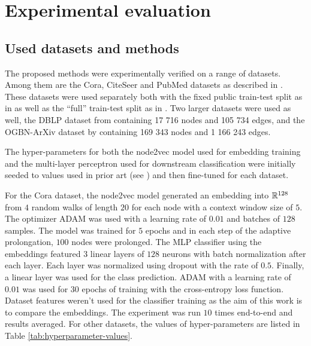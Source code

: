 \section{Experimental evaluation}

\subsection{Used datasets and methods}

The proposed methods were experimentally verified on a range of datasets. Among them are the Cora, CiteSeer and PubMed datasets as described in \cite{yang_revisiting_2016}. These datasets were used separately both with the fixed public train-test split as in \cite{yang_revisiting_2016} as well as the \enquote{full} train-test split as in \cite{chen_fastgcn_2018}. Two larger datasets were used as well, the DBLP dataset from \cite{bojchevski_deep_2018} containing 17 716 nodes and 105 734 edges, and the OGBN-ArXiv dataset by \cite{hu_open_2021} containing 169 343 nodes and 1 166 243 edges.

The hyper-parameters for both the node2vec model used for embedding training and the multi-layer perceptron used for downstream classification were initially seeded to values used in prior art (see \cite{hu_open_2021}) and then fine-tuned for each dataset.

For the Cora dataset, the node2vec model generated an embedding into \( \mathbb{R}^{128} \) from \( 4 \) random walks of length \( 20 \) for each node with a context window size of \( 5 \). The optimizer ADAM \cite{kingma_adam:_2017} was used with a learning rate of \( 0.01 \) and batches of \( 128 \) samples. The model was trained for \( 5 \) epochs and in each step of the adaptive prolongation, \( 100 \) nodes were prolonged. The MLP classifier using the embeddings featured \( 3 \) linear layers of \( 128 \) neurons with batch normalization after each layer. Each layer was normalized using dropout \cite{srivastava_dropout_2014} with the rate of \( 0.5 \). Finally, a linear layer was used for the class prediction. ADAM with a learning rate of \( 0.01 \)  was used for \( 30 \) epochs of training with the cross-entropy loss function. Dataset features weren't used for the classifier training as the aim of this work is to compare the embeddings. The experiment was run \( 10 \) times end-to-end and results averaged. For other datasets, the values of hyper-parameters are listed in Table \ref{tab:hyperparameter-values}.

